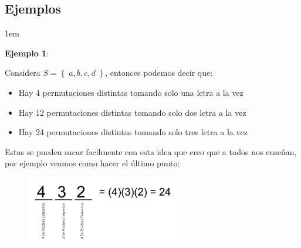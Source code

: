\documentclass[12pt, fleqn]{report}                             %
\newenvironment{SmallIndentation}[1][0.75em]                    %
        {\begin{adjustwidth}{#1}{}\begin{footnotesize}}             %
        {\end{footnotesize}\end{adjustwidth}}                       %
\theoremstyle{break}                                            %
\newcommand{\Set}[1]            {\left\{ \; #1 \; \right\}}     %
\begin{document}
            \vspace{1em}
            \subsection{Ejemplos}

                \begin{SmallIndentation}[1em]
                    \textbf{Ejemplo 1}:
                    
                    Considera $S = \Set{a, b, c, d}$, entonces podemos decir que:
                    \begin{itemize}
                        \item Hay 4 permutaciones distintas tomando solo una letra a la vez
                        \item Hay 12 permutaciones distintas tomando solo dos letra a la vez
                        \item Hay 24 permutaciones distintas tomando solo tres letra a la vez
                    \end{itemize}

                    Estas se pueden sacar facilmente con esta idea que creo que a todos nos enseñan,
                    por ejemplo veamos como hacer el último punto:
                    \begin{figure}[h]
                        \includegraphics[width=0.6\textwidth]{PermutacionesEjemplo}
                    \end{figure}
                    
                
                \end{SmallIndentation}


        \clearpage
\end{document}

